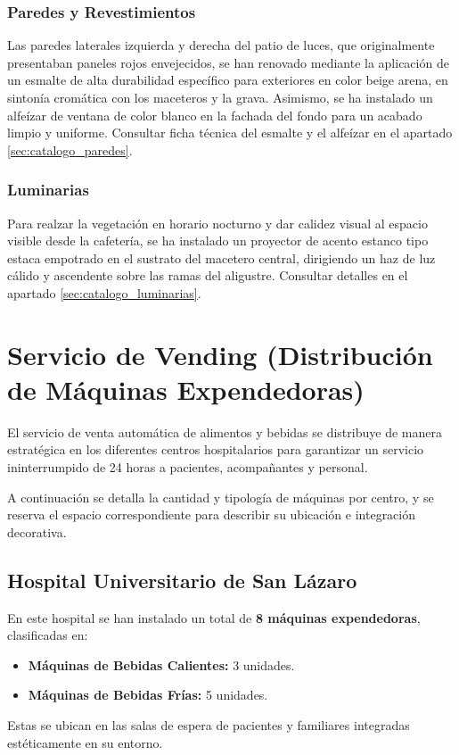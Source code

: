 \documentclass[12pt,a4paper]{article}
\begin{document}
\subsubsection{Paredes y Revestimientos}
Las paredes laterales izquierda y derecha del patio de luces, que originalmente presentaban paneles rojos envejecidos, se han renovado mediante la aplicación de un esmalte de alta durabilidad específico para exteriores en color beige arena, en sintonía cromática con los maceteros y la grava. Asimismo, se ha instalado un alfeízar de ventana de color blanco en la fachada del fondo para un acabado limpio y uniforme. Consultar ficha técnica del esmalte y el alfeízar en el apartado \ref{sec:catalogo_paredes}.

\subsubsection{Luminarias}
Para realzar la vegetación en horario nocturno y dar calidez visual al espacio visible desde la cafetería, se ha instalado un proyector de acento estanco tipo estaca empotrado en el sustrato del macetero central, dirigiendo un haz de luz cálido y ascendente sobre las ramas del aligustre. Consultar detalles en el apartado \ref{sec:catalogo_luminarias}.

\section{Servicio de Vending (Distribución de Máquinas Expendedoras)}
El servicio de venta automática de alimentos y bebidas se distribuye de manera estratégica en los diferentes centros hospitalarios para garantizar un servicio ininterrumpido de 24 horas a pacientes, acompañantes y personal.

A continuación se detalla la cantidad y tipología de máquinas por centro, y se reserva el espacio correspondiente para describir su ubicación e integración decorativa.

\subsection{Hospital Universitario de San Lázaro}
En este hospital se han instalado un total de \textbf{8 máquinas expendedoras}, clasificadas en:
\begin{itemize}
    \item \textbf{Máquinas de Bebidas Calientes:} 3 unidades.
    \item \textbf{Máquinas de Bebidas Frías:} 5 unidades.





\end{itemize}
Estas se ubican en las salas de espera de pacientes y familiares integradas estéticamente en su entorno.
\end{document}
